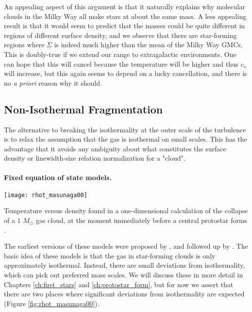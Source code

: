 An appealing aspect of this argument is that it naturally explains why molecular clouds in the Milky Way all make stars at about the same mass. A less appealing result is that it would seem to predict that the masses could be quite different in regions of different surface density, and we observe that there are star-forming regions where $\Sigma$ is indeed much higher than the mean of the Milky Way GMCs. This is doubly-true if we extend our range to extragalactic environments. One can hope that this will cancel because the temperature will be higher and thus $c_s$ will increase, but this again seems to depend on a lucky cancellation, and there is no \textit{a priori} reason why it should.

\subsection{Non-Isothermal Fragmentation}

The alternative to breaking the isothermality at the outer scale of the turbulence is to relax the assumption that the gas is isothermal on small scales. This has the advantage that it avoids any ambiguity about what constitutes the surface density or linewidth-size relation normalization for a "cloud".

\paragraph{Fixed equation of state models.}

\begin{marginfigure}
\texttt{[image: rhot\_masunaga00]}
\caption[Temperature versus density in a collapsing core]{
\label{fig:rhot_masunaga00}
Temperature versus density found in a one-dimensional calculation of the collapse of a $1$ $M_\odot$ gas cloud, at the moment immediately before a central protostar forms \citep{masunaga00a}.
}
\end{marginfigure}
The earliest versions of these models were proposed by \citet{larson05a}, and followed up by \citet{jappsen05a}. The basic idea of these models is that the gas in star-forming clouds is only approximately isothermal. Instead, there are small deviations from isothermality, which can pick out preferred mass scales. We will discuss these in more detail in Chapters \ref{ch:first_stars} and \ref{ch:protostar_form}, but for now we assert that there are two places where significant deviations from isothermality are expected (Figure \ref{fig:rhot_masunaga00}).

